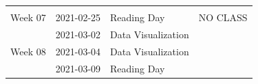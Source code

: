 \documentclass[
]{book}
\begin{document}
\begin{longtable}[]{@{}llll@{}}
\begin{minipage}[t]{0.22\columnwidth}
\end{minipage}\tabularnewline
\begin{minipage}[t]{0.22\columnwidth}\raggedright
Week 07\strut
\end{minipage} & \begin{minipage}[t]{0.22\columnwidth}\raggedright
2021-02-25\strut
\end{minipage} & \begin{minipage}[t]{0.22\columnwidth}\raggedright
Reading Day\strut
\end{minipage} & \begin{minipage}[t]{0.22\columnwidth}\raggedright
NO CLASS\strut
\end{minipage}\tabularnewline
\begin{minipage}[t]{0.22\columnwidth}\raggedright
\strut
\end{minipage} & \begin{minipage}[t]{0.22\columnwidth}\raggedright
2021-03-02\strut
\end{minipage} & \begin{minipage}[t]{0.22\columnwidth}\raggedright
Data Visualization\strut
\end{minipage} & \begin{minipage}[t]{0.22\columnwidth}\raggedright
\strut
\end{minipage}\tabularnewline
\begin{minipage}[t]{0.22\columnwidth}\raggedright
Week 08\strut
\end{minipage} & \begin{minipage}[t]{0.22\columnwidth}\raggedright
2021-03-04\strut
\end{minipage} & \begin{minipage}[t]{0.22\columnwidth}\raggedright
Data Visualization\strut
\end{minipage} & \begin{minipage}[t]{0.22\columnwidth}\raggedright
\strut
\end{minipage}\tabularnewline
\begin{minipage}[t]{0.22\columnwidth}\raggedright
\strut
\end{minipage} & \begin{minipage}[t]{0.22\columnwidth}\raggedright
2021-03-09\strut
\end{minipage} & \begin{minipage}[t]{0.22\columnwidth}\raggedright
Reading Day\strut
\end{minipage} & \begin{minipage}[t]{0.22\columnwidth}\raggedright

\end{minipage}
\end{longtable}
\end{document}
